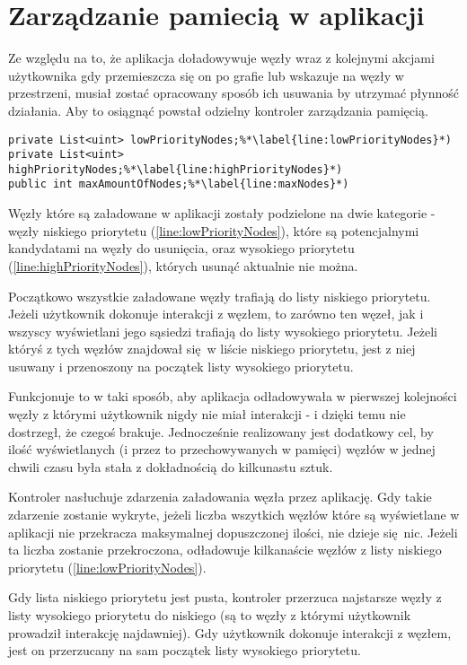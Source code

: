 \section{Zarządzanie pamiecią w aplikacji}
\label{sec:pamiec}
Ze względu na to, że aplikacja doładowywuje węzły wraz z kolejnymi akcjami użytkownika gdy przemieszcza się on po grafie lub wskazuje na węzły w przestrzeni, musiał zostać opracowany sposób ich usuwania by utrzymać płynność działania. Aby to osiągnąć powstał odzielny kontroler zarządzania pamięcią.

\begin{lstlisting}[caption={Pomocnicze struktury i zmienne kontrolera zarządzania pamięcią}, label=lst:nodePriority]
private List<uint> lowPriorityNodes;%*\label{line:lowPriorityNodes}*)
private List<uint> highPriorityNodes;%*\label{line:highPriorityNodes}*)
public int maxAmountOfNodes;%*\label{line:maxNodes}*)
\end{lstlisting}

Węzły które są załadowane w aplikacji zostały podzielone na dwie kategorie - węzły niskiego priorytetu (\ref{line:lowPriorityNodes}), które są potencjalnymi kandydatami na węzły do usunięcia, oraz wysokiego priorytetu (\ref{line:highPriorityNodes}), których usunąć aktualnie nie można.

Początkowo wszystkie załadowane węzły trafiają do listy niskiego priorytetu. Jeżeli użytkownik dokonuje interakcji z węzłem, to zarówno ten węzeł, jak i wszyscy wyświetlani jego sąsiedzi trafiają do listy wysokiego priorytetu. Jeżeli któryś z tych węzłów znajdował się w liście niskiego priorytetu, jest z niej usuwany i przenoszony na początek listy wysokiego priorytetu.

Funkcjonuje to w taki sposób, aby aplikacja odładowywała w pierwszej kolejności węzły z którymi użytkownik nigdy nie miał interakcji - i dzięki temu nie dostrzegł, że czegoś brakuje. Jednocześnie realizowany jest dodatkowy cel, by ilość wyświetlanych (i przez to przechowywanych w pamięci) węzłów w jednej chwili czasu była stała z dokładnością do kilkunastu sztuk.

Kontroler nasłuchuje zdarzenia załadowania węzła przez aplikację. Gdy takie zdarzenie zostanie wykryte, jeżeli liczba wszytkich węzłów które są wyświetlane w aplikacji nie przekracza maksymalnej dopuszczonej ilości, nie dzieje się nic. Jeżeli ta liczba zostanie przekroczona, odładowuje kilkanaście węzłów z listy niskiego priorytetu (\ref{line:lowPriorityNodes}).

Gdy lista niskiego priorytetu jest pusta, kontroler przerzuca najstarsze węzły z listy wysokiego priorytetu do niskiego (są to węzły z którymi użytkownik prowadził interakcję najdawniej). Gdy użytkownik dokonuje interakcji z węzłem, jest on przerzucany na sam początek listy wysokiego priorytetu.